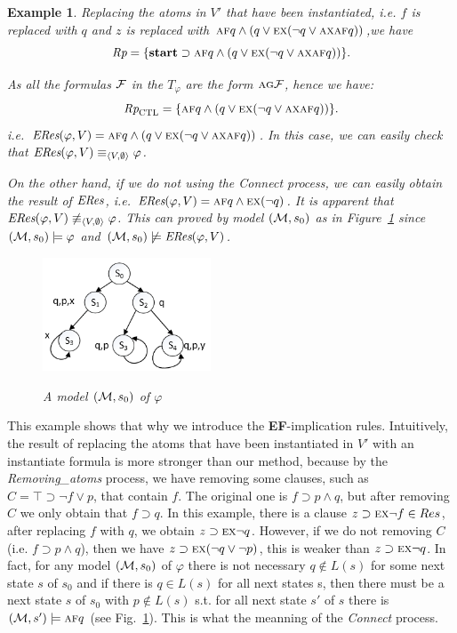 \documentclass{article}
\newtheorem{example}{Example}
\begin{document}
\begin{example}
Replacing the atoms in $V'$ that have been instantiated, i.e. $f$ is replaced with $q$ and $z$ is  replaced with $\textsc{a}\textsc{f} q \wedge (q \vee \textsc{e} \textsc{x}(\neg q \vee \textsc{a}\textsc{x} \textsc{a}\textsc{f} q))$,we have
\[
\emph{Rp}= \{\textbf{start} \supset  \textsc{a}\textsc{f} q \wedge (q \vee \textsc{e} \textsc{x}(\neg q \vee \textsc{a}\textsc{x} \textsc{a}\textsc{f} q))\}.
\]

As all the formulas $\cal F$ in the $T_{\varphi}$ are the form $\textsc{a}\textsc{g} \cal F$, hence we have:
\[
\emph{Rp}_{\textrm{CTL}} = \{\textsc{a}\textsc{f} q \wedge (q \vee \textsc{e} \textsc{x}(\neg q \vee \textsc{a}\textsc{x} \textsc{a}\textsc{f} q))\}.
\]
i.e. $\emph{ERes}(\varphi, V) = \textsc{a}\textsc{f} q \wedge (q \vee \textsc{e} \textsc{x}(\neg q \vee \textsc{a}\textsc{x} \textsc{a}\textsc{f} q))$.
In this case, we can easily check that $\emph{ERes}(\varphi, V) \equiv_{{\langle{V, \emptyset}\rangle}} \varphi$.


On the other hand, if we do not using the \emph{Connect} process, we can easily obtain the result of $\emph{ERes}$, i.e. $\emph{ERes}(\varphi, V) = \textsc{a}\textsc{f} q \wedge  \textsc{e} \textsc{x}(\neg q)$.
It is apparent that $\emph{ERes}(\varphi, V) \not\equiv_{{\langle{V, \emptyset}\rangle}} \varphi$. This can proved by model $({\cal M},s_0)$ as in Figure~\ref{Fig:models} since $({\cal M}, s_0) \models \varphi$ and $({\cal M}, s_0) \not \models \emph{ERes}(\varphi, V)$.
\begin{figure}
  \centering
  \includegraphics[width=5cm]{models.png}\\
  \caption{A model $({\cal M}, s_0)$ of $\varphi$}\label{Fig:models}
\end{figure}
\end{example}

This example shows that why we introduce the \textbf{EF}-implication rules. Intuitively, the result of replacing the atoms that have been instantiated in $V'$ with an instantiate formula is more stronger than our method, because by the \emph{Removing\_atoms} process, we have removing some clauses, such as $C= \top \supset \neg f \vee p$, that contain $f$. The original one is $f \supset p \wedge q$, but after removing $C$ we only obtain that $f \supset q$. In this example, there is a clause $z \supset \textsc{e} \textsc{x} \neg f \in Res$, after replacing $f$ with $q$, we obtain $z \supset \textsc{e} \textsc{x} \neg q$. However, if we do not removing $C$ (i.e. $f \supset p \wedge q$), then we have $z \supset \textsc{e} \textsc{x} (\neg q \vee \neg p)$, this is weaker than $z \supset \textsc{e} \textsc{x} \neg q$.
In fact, for any model $({\cal M}, s_0)$ of $\varphi$ there is not necessary $q\not \in L(s)$ for some next state $s$ of $s_0$ and if there is $q \in L(s)$ for all next states s, then there must be a next state $s$ of $s_0$ with $p \not \in L(s)$ s.t. for all next state $s'$ of $s$ there is $({\cal M}, s')\models \textsc{a}\textsc{f} q$ (see Fig.~\ref{Fig:models}).
This is what the meanning of the \emph{Connect} process.
\end{document}
